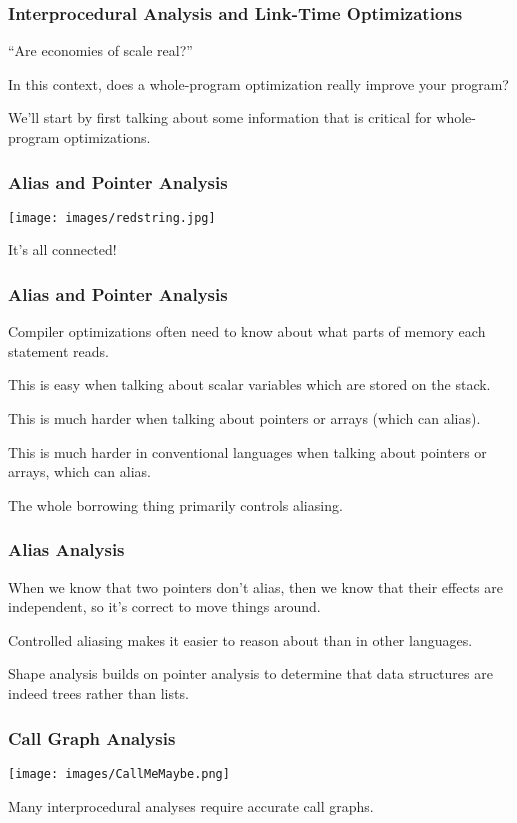 \begin{frame}
\frametitle{Interprocedural Analysis and Link-Time Optimizations}

``Are economies of scale real?''

In this context, does a
whole-program optimization really improve your program?


We'll start by first talking about some information that is critical for
whole-program optimizations.

\end{frame}


\begin{frame}
\frametitle{Alias and Pointer Analysis}

\begin{center}
	\texttt{[image: images/redstring.jpg]}
\end{center}

It's all connected!

\end{frame}


\begin{frame}
\frametitle{Alias and Pointer Analysis}

Compiler optimizations often need
to know about what parts of memory each statement reads.  

This is
easy when talking about scalar variables which are stored on the
stack. 

This is much harder when talking about pointers or arrays
(which can alias). 

This is much harder in conventional languages when talking about pointers or arrays, which can alias. 

The whole borrowing thing primarily controls aliasing.

\end{frame}

\begin{frame}
\frametitle{Alias Analysis}

When we know that two pointers don't alias, then we know that their
effects are independent, so it's correct to move things around.

Controlled aliasing makes it easier to reason about than in other languages.

Shape analysis
builds on pointer analysis to determine that data structures are indeed
trees rather than lists.


\end{frame}


\begin{frame}
\frametitle{Call Graph Analysis}

\begin{center}
	\texttt{[image: images/CallMeMaybe.png]}
\end{center}

Many interprocedural analyses require accurate call graphs. 

\end{frame}


